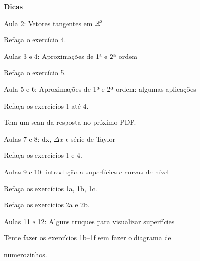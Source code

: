 \documentclass[oneside,12pt]{article}
\begin{document}
{\bf Dicas}


\ssk

Aula 2: Vetores tangentes em $\mathbb{R}^2$

Refaça o exercício 4.


\msk

Aulas 3 e 4: Aproximações de 1ª e 2ª ordem

Refaça o exercício 5.


\msk

Aula 5 e 6: Aproximações de 1ª e 2ª ordem: algumas aplicações

Refaça os exercícios 1 até 4.

Tem um scan da resposta no próximo PDF.


\msk


Aulas 7 e 8: dx, $Δx$ e série de Taylor

Refaça os exercícios 1 e 4.


\msk

Aulas 9 e 10: introdução a superfícies e curvas de nível

Refaça os exercícios 1a, 1b, 1c.

Refaça os exercícios 2a e 2b.


\newpage

Aulas 11 e 12: Alguns truques para visualizar superfícies

Tente fazer os exercícios 1b--1f sem fazer o diagrama de

numerozinhos.


\msk

\end{document}
